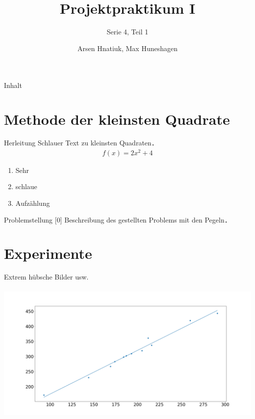 \documentclass{beamer}
\title{Projektpraktikum I}
\subtitle{Serie 4, Teil 1}
\author{Arsen Hnatiuk, Max Huneshagen}
\begin{document}
\begin{frame}
  \maketitle
\end{frame}

\begin{frame}{Inhalt}
  \tableofcontents
\end{frame}

\section{Methode der kleinsten Quadrate}

\begin{frame}{Herleitung}
  Schlauer Text zu kleinsten Quadraten．
  \begin{align}
  f(x)=2x^2+4
  \end{align}

  \pause

  \begin{enumerate}
  \item Sehr\pause
  \item schlaue\pause
  \item Aufzählung
  \end{enumerate}

  \pause

\end{frame}

\begin{frame}{Problemstellung [0]}
  Beschreibung des gestellten Problems mit den Pegeln．

\end{frame}

\section{Experimente}
\begin{frame}
Extrem hübsche Bilder usw.\\~\\
\includegraphics[width=\textwidth]{Beispielbild}
\end{frame}
\end{document}
